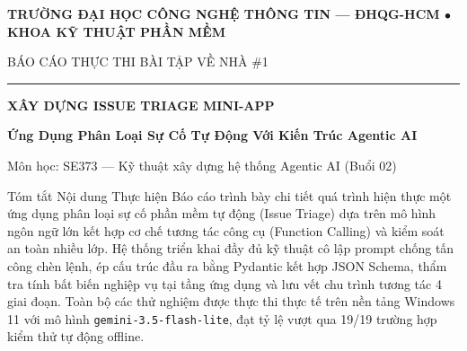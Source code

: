 \documentclass[11pt,a4paper]{article}
\begin{document}
\begin{titlepage}
  \centering
  \vspace*{0.4cm}
  
  \begin{tcolorbox}[colback=primary, colframe=primary, arc=2mm, width=\textwidth, halign=center]
    {\bfseries\color{white}\small TRƯỜNG ĐẠI HỌC CÔNG NGHỆ THÔNG TIN — ĐHQG-HCM $\bullet$ KHOA KỸ THUẬT PHẦN MỀM\par}
  \end{tcolorbox}
  
  \vspace{0.6cm}
  {\scshape\large BÁO CÁO THỰC THI BÀI TẬP VỀ NHÀ \#1 \par}
  \vspace{0.25cm}
  {\color{secondary}\rule{0.5\textwidth}{1.2pt}\par}
  \vspace{0.6cm}
  
  {\LARGE\bfseries\color{primary} XÂY DỰNG ISSUE TRIAGE MINI-APP \par}
  \vspace{0.3cm}
  {\Large\bfseries\color{secondary} Ứng Dụng Phân Loại Sự Cố Tự Động Với Kiến Trúc Agentic AI \par}
  \vspace{0.2cm}
  {\small\color{darkslate} Môn học: SE373 — Kỹ thuật xây dựng hệ thống Agentic AI (Buổi 02) \par}
  \vspace{0.8cm}
  
  \begin{calloutbox}[secondary]{Tóm tắt Nội dung Thực hiện}
    Báo cáo trình bày chi tiết quá trình hiện thực một ứng dụng phân loại sự cố phần mềm tự động (Issue Triage) dựa trên mô hình ngôn ngữ lớn kết hợp cơ chế tương tác công cụ (Function Calling) và kiểm soát an toàn nhiều lớp. Hệ thống triển khai đầy đủ kỹ thuật cô lập prompt chống tấn công chèn lệnh, ép cấu trúc đầu ra bằng Pydantic kết hợp JSON Schema, thẩm tra tính bất biến nghiệp vụ tại tầng ứng dụng và lưu vết chu trình tương tác 4 giai đoạn. Toàn bộ các thử nghiệm được thực thi thực tế trên nền tảng Windows 11 với mô hình \texttt{gemini-3.5-flash-lite}, đạt tỷ lệ vượt qua 19/19 trường hợp kiểm thử tự động offline.
  \end{calloutbox}
  
  \vfill
  

\end{titlepage}
\end{document}
